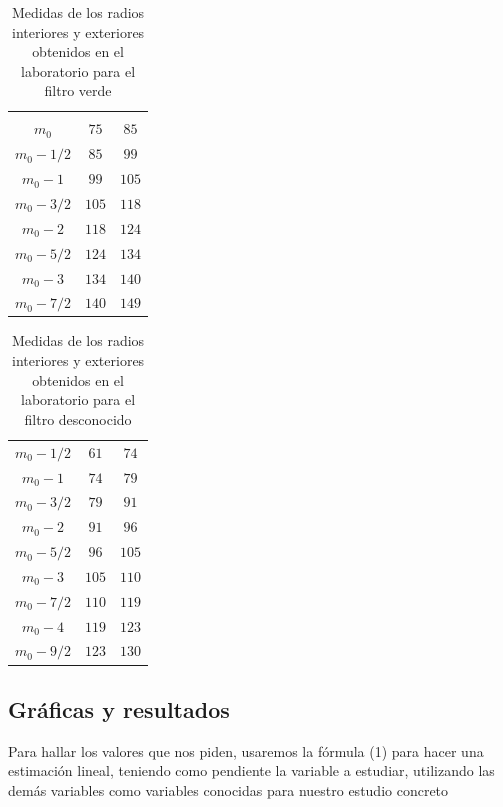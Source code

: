 \documentclass[11pt,letterpaper,twocolumn]{article}
\begin{document}

\begin{table}[H]
	\caption{Medidas de los radios interiores y exteriores obtenidos en el laboratorio para el filtro verde}
		\centering
	\begin{tabular}{|c|c|c|}
		\hline
		\rowcolor{green}
		\multicolumn{3}{|c|}{Filtro verde $\lambda= 525 $ nm} \\ \hline
		\pmb{	$m$} & \pmb{$R_{int} \pm 1 mm$} & \pmb{$R_{ext} \pm 1 mm$} \\ \hline
		$m_0$ & $75$ & $85$ \\
		$m_0-1/2$ & $85$ & $99$ \\ 
		$m_0 -1$ & $99$ & $105$ \\ 
		$m_0-3/2$ & $105$ & $118$ \\ 
		$m_0-2$ & $118$ & $124$ \\ 
		$m_0-5/2$ & $124$ &$ 134$ \\
		$m_0-3$ & $134$ & $140$ \\ 
		$m_0-7/2$ & $140$ & $149$ \\ \hline
	\end{tabular}
	\label{}
\end{table}

\begin{table}[H]
	\caption{Medidas de los radios interiores y exteriores obtenidos en el laboratorio para el filtro desconocido}
		\centering
	\begin{tabular}{|c|c|c|}
		\hline
		\pmb{$m$} & \pmb{ $R_{int} \pm 1 mm$} & \pmb{$R_{ext} \pm 1 mm$} \\ \hline
		$m_0-1/2$ & $61$ & $74$ \\ 
		$m_0 -1$ & $74$ & $79$ \\ 
		$m_0-3/2$ & $79$ & $ 91$ \\
		$m_0-2$ & $91$ & $96$ \\
		$m_0-5/2$ & $96$ & $105$ \\ 
		$m_0-3$ & $105$ & $110$ \\ 
		$m_0-7/2$ & $110$ & $119$ \\ 
		$m_0 - 4$ & $119$ & $123$ \\ 
		$m_0 - 9/2$ & $123$ & $130$ \\ \hline
	\end{tabular}
	\label{}
\end{table}


\subsection{Gráficas y resultados}
Para hallar los valores que nos piden, usaremos la fórmula (1) para hacer una estimación lineal, teniendo como pendiente la variable a estudiar, utilizando las demás variables como variables conocidas para nuestro estudio concreto
\end{document}
